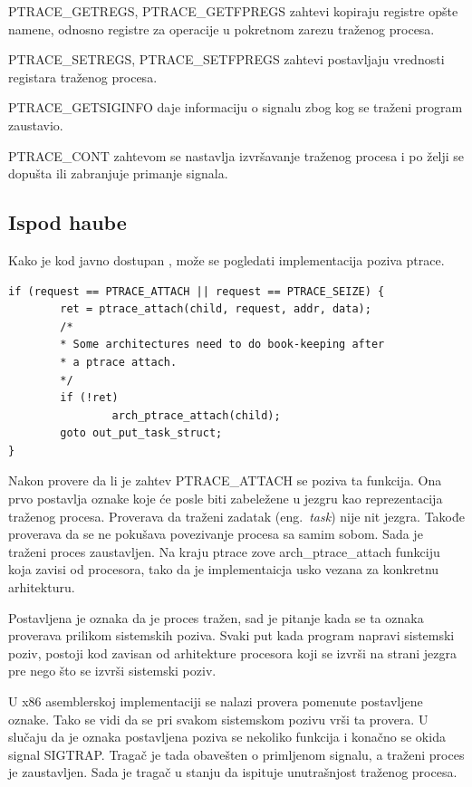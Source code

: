 \documentclass[a4paper]{article}
\begin{document}
PTRACE\_GETREGS, PTRACE\_GETFPREGS
    zahtevi kopiraju registre opšte namene, odnosno registre za operacije u pokretnom zarezu 
    traženog procesa.

PTRACE\_SETREGS, PTRACE\_SETFPREGS
    zahtevi postavljaju vrednosti registara traženog procesa.

PTRACE\_GETSIGINFO 
    daje informaciju o signalu zbog kog se traženi program zaustavio.

PTRACE\_CONT
    zahtevom se nastavlja izvršavanje traženog procesa i po želji se 
    dopušta ili zabranjuje primanje signala.
\subsection{Ispod haube}	

Kako je kod javno dostupan \cite{code}, može se pogledati implementacija poziva ptrace.
\begin{verbatim}
if (request == PTRACE_ATTACH || request == PTRACE_SEIZE) {
        ret = ptrace_attach(child, request, addr, data);
        /*
        * Some architectures need to do book-keeping after
        * a ptrace attach.
        */
        if (!ret)
                arch_ptrace_attach(child);
        goto out_put_task_struct;
}
\end{verbatim}

Nakon provere da li je zahtev PTRACE\_ATTACH se poziva ta funkcija.
Ona prvo postavlja oznake koje će posle biti zabeležene u jezgru kao reprezentacija 
traženog procesa. Proverava da traženi zadatak (eng.~{\em task}) nije nit jezgra. 
Takođe proverava da se ne pokušava povezivanje procesa sa samim sobom.
Sada je traženi proces zaustavljen. Na kraju ptrace zove arch\_ptrace\_attach funkciju koja zavisi
od procesora, tako da je implementaicja usko vezana za konkretnu arhitekturu.

Postavljena je oznaka da je proces tražen, sad je pitanje kada se ta oznaka proverava prilikom 
sistemskih poziva. Svaki put kada program napravi sistemski poziv, postoji kod zavisan od arhitekture
procesora koji se izvrši na strani jezgra pre nego što se izvrši sistemski poziv.

U x86 asemblerskoj implementaciji se nalazi provera pomenute postavljene oznake\cite{blog}.
Tako se vidi da se pri svakom sistemskom pozivu vrši ta provera. 
U slučaju da je oznaka postavljena poziva se nekoliko funkcija i konačno se okida signal SIGTRAP.
Tragač je tada obavešten o primljenom signalu, a traženi proces je zaustavljen. 
Sada je tragač u stanju da ispituje unutrašnjost traženog procesa.
\end{document}
